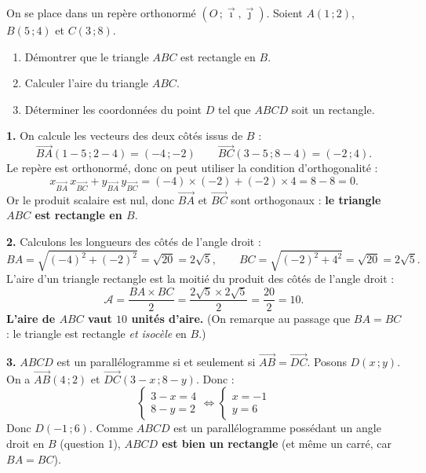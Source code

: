 \documentclass[11pt]{article}
\begin{document}
\begin{exoresolu}
On se place dans un repère orthonormé $(O\,;\vec{\imath},\vec{\jmath})$. Soient $A(1\,;2)$, $B(5\,;4)$ et $C(3\,;8)$.
\begin{enumerate}
\item Démontrer que le triangle $ABC$ est rectangle en $B$.
\item Calculer l'aire du triangle $ABC$.
\item Déterminer les coordonnées du point $D$ tel que $ABCD$ soit un rectangle.
\end{enumerate}
\tcblower
\textbf{1.} On calcule les vecteurs des deux côtés issus de $B$ :
\[ \overrightarrow{BA}(1-5\,;2-4) = (-4\,;-2) \qquad \overrightarrow{BC}(3-5\,;8-4) = (-2\,;4). \]
Le repère est orthonormé, donc on peut utiliser la condition d'orthogonalité :
\[ x_{\overrightarrow{BA}}\,x_{\overrightarrow{BC}} + y_{\overrightarrow{BA}}\,y_{\overrightarrow{BC}} = (-4)\times(-2) + (-2)\times 4 = 8 - 8 = 0. \]
Or le produit scalaire est nul, donc $\overrightarrow{BA}$ et $\overrightarrow{BC}$ sont orthogonaux : \textbf{le triangle $ABC$ est rectangle en $B$}.

\textbf{2.} Calculons les longueurs des côtés de l'angle droit :
\[ BA = \sqrt{(-4)^2+(-2)^2} = \sqrt{20} = 2\sqrt{5}, \qquad BC = \sqrt{(-2)^2+4^2} = \sqrt{20} = 2\sqrt{5}. \]
L'aire d'un triangle rectangle est la moitié du produit des côtés de l'angle droit :
\[ \mathcal{A} = \frac{BA \times BC}{2} = \frac{2\sqrt{5}\times 2\sqrt{5}}{2} = \frac{20}{2} = 10. \]
\textbf{L'aire de $ABC$ vaut $10$ unités d'aire.} (On remarque au passage que $BA = BC$ : le triangle est rectangle \emph{et isocèle} en $B$.)

\textbf{3.} $ABCD$ est un parallélogramme si et seulement si $\overrightarrow{AB} = \overrightarrow{DC}$. Posons $D(x\,;y)$. On a $\overrightarrow{AB}(4\,;2)$ et $\overrightarrow{DC}(3-x\,;8-y)$. Donc :
\[ \begin{cases} 3 - x = 4 \\ 8 - y = 2 \end{cases} \iff \begin{cases} x = -1 \\ y = 6 \end{cases} \]
Donc $D(-1\,;6)$. Comme $ABCD$ est un parallélogramme possédant un angle droit en $B$ (question 1), \textbf{$ABCD$ est bien un rectangle} (et même un carré, car $BA = BC$).
\end{exoresolu}
\end{document}
